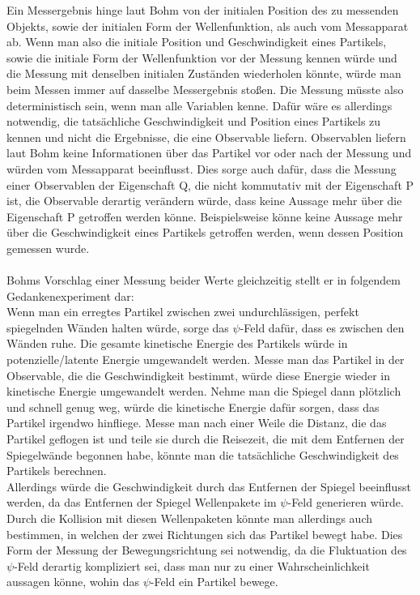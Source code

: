 Ein Messergebnis hinge laut Bohm von der initialen Position des zu messenden Objekts, sowie der initialen Form der Wellenfunktion, als auch vom Messapparat ab. Wenn man also die initiale Position und Geschwindigkeit eines Partikels, sowie die initiale Form der Wellenfunktion vor der Messung kennen würde und die Messung mit denselben initialen Zuständen wiederholen könnte, würde man beim Messen immer auf dasselbe Messergebnis stoßen. Die Messung müsste also deterministisch sein, wenn man alle Variablen kenne. Dafür wäre es allerdings notwendig, die tatsächliche Geschwindigkeit und Position eines Partikels zu kennen und nicht die Ergebnisse, die eine Observable liefern. Observablen liefern laut Bohm keine Informationen über das Partikel vor oder nach der Messung und würden vom Messapparat beeinflusst. Dies sorge auch dafür, dass die Messung einer Observablen der Eigenschaft Q, die nicht kommutativ mit der Eigenschaft P ist, die Observable derartig verändern würde, dass keine Aussage mehr über die Eigenschaft P getroffen werden könne. Beispielsweise könne keine Aussage mehr über die Geschwindigkeit eines Partikels getroffen werden, wenn dessen Position gemessen wurde.\\\\
Bohms Vorschlag einer Messung beider Werte gleichzeitig stellt er in folgendem Gedankenexperiment dar:\\
Wenn man ein erregtes Partikel zwischen zwei undurchlässigen, perfekt spiegelnden Wänden halten würde, sorge das $\psi$-Feld dafür, dass es zwischen den Wänden ruhe. Die gesamte kinetische Energie des Partikels würde in potenzielle/latente Energie umgewandelt werden. Messe man das Partikel in der Observable, die die Geschwindigkeit bestimmt, würde diese Energie wieder in kinetische Energie umgewandelt werden. Nehme man die Spiegel dann plötzlich und schnell genug weg, würde die kinetische Energie dafür sorgen, dass das Partikel irgendwo hinfliege. Messe man nach einer Weile die Distanz, die das Partikel geflogen ist und teile sie durch die Reisezeit, die mit dem Entfernen der Spiegelwände begonnen habe, könnte man die tatsächliche Geschwindigkeit des Partikels berechnen. \\Allerdings würde die Geschwindigkeit durch das Entfernen der Spiegel beeinflusst werden, da das Entfernen der Spiegel Wellenpakete im $\psi$-Feld  generieren würde. Durch die Kollision mit diesen Wellenpaketen könnte man allerdings auch bestimmen, in welchen der zwei Richtungen sich das Partikel bewegt habe. Dies Form der Messung der Bewegungsrichtung sei notwendig, da die Fluktuation des $\psi$-Feld derartig kompliziert sei, dass man nur zu einer Wahrscheinlichkeit aussagen könne, wohin das $\psi$-Feld ein Partikel bewege.

